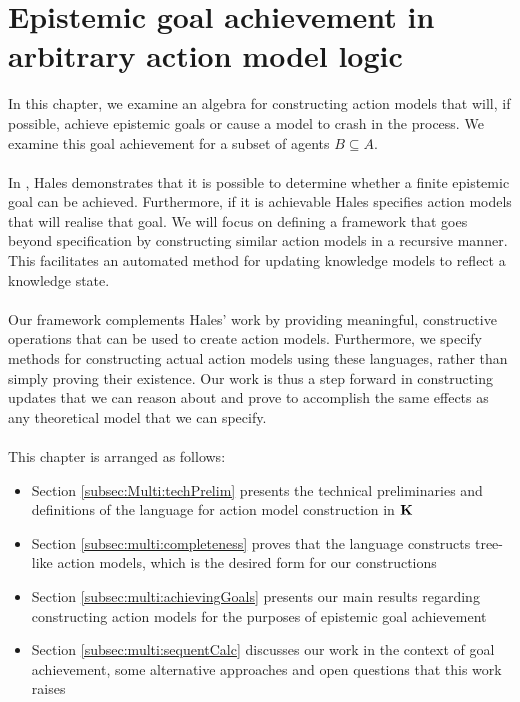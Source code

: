 \chapter{Epistemic goal achievement in arbitrary action model logic} \label{chapter:Multiagent}

In this chapter, we examine an algebra for constructing action models that will, if possible, achieve
epistemic goals or cause a model to crash in the process.
We examine this goal achievement for a subset of agents $B \subseteq A$.\\
\\
In \cite{hales13synthesis}, Hales demonstrates that it is possible to determine whether a
finite epistemic goal can be achieved.
Furthermore, if it is achievable Hales specifies action models that will realise
that goal.
We will focus on defining a framework that goes beyond specification by constructing similar action models in a
recursive manner.
This facilitates an automated method for updating knowledge models to reflect a
knowledge state.\\
\\
Our framework complements Hales' work by providing meaningful, constructive operations
that can be used to create action models.
Furthermore, we specify methods for constructing actual action models using these languages, rather
than simply proving their existence.
Our work is thus a step forward in constructing updates that we can reason about and prove to
accomplish the same effects as any theoretical model that we can specify.\\
\\
This chapter is arranged as follows:

\begin{itemize}
	\item Section \ref{subsec:Multi:techPrelim} presents the technical preliminaries and definitions
		of the language for action model construction in $\bf K$
	\item Section \ref{subsec:multi:completeness} proves that the language
  constructs tree-like action
		models, which is the desired form for our constructions
	\item Section \ref{subsec:multi:achievingGoals} presents our main results regarding constructing
		action models for the purposes of epistemic goal achievement
	\item Section \ref{subsec:multi:sequentCalc} discusses our work in the context of goal
		achievement, some alternative approaches and open questions that this work raises
\end{itemize}

